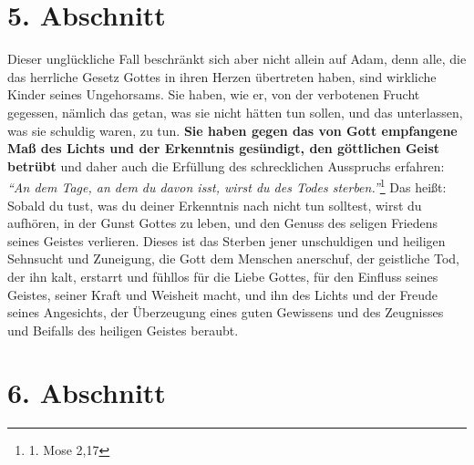\section{5. Abschnitt} \label{kap7_ab5}

Dieser unglückliche Fall beschränkt sich aber nicht allein auf Adam, denn alle,
die das herrliche Gesetz Gottes in ihren Herzen übertreten haben, sind wirkliche
Kinder seines Ungehorsams. Sie haben, wie er, von der verbotenen
Frucht
gegessen, nämlich das getan, was sie nicht hätten tun sollen, und das
unterlassen, was sie schuldig waren, zu tun. \textbf{Sie haben gegen das von
Gott
empfangene Maß des Lichts und der Erkenntnis gesündigt, den göttlichen Geist
betrübt} und daher auch die Erfüllung des schrecklichen Ausspruchs erfahren:
\textit{"`An dem Tage, an dem du davon isst, wirst du des Todes
sterben."'}\footnote{1. Mose 2,17}
Das heißt: Sobald du tust, was du deiner Erkenntnis nach nicht tun
solltest, wirst du aufhören, in der Gunst Gottes zu
leben, und den Genuss des
seligen Friedens seines Geistes verlieren. Dieses ist das
Sterben jener
unschuldigen und heiligen Sehnsucht und Zuneigung, die Gott dem Menschen
anerschuf, der geistliche Tod, der ihn kalt, erstarrt und
fühllos für die Liebe
Gottes, für den Einfluss seines Geistes, seiner Kraft und
Weisheit macht, und ihn
des Lichts und der Freude seines Angesichts, der Überzeugung eines guten
Gewissens und des Zeugnisses und Beifalls des heiligen Geistes beraubt.

\section{6. Abschnitt} \label{kap7_ab6}

